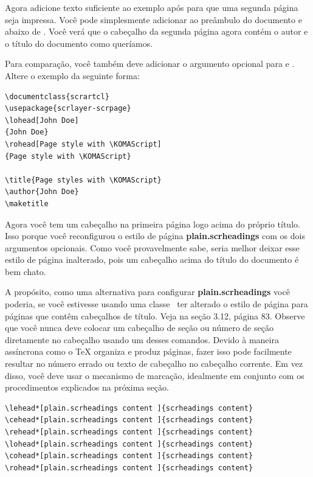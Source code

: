 Agora adicione texto suficiente ao exemplo após  para que uma segunda página seja impressa. Você pode simplesmente adicionar  ao preâmbulo do documento e  abaixo de . Você verá que o cabeçalho da segunda página agora contém o autor e o título do documento como queríamos.

Para comparação, você também deve adicionar o argumento opcional para 
 e . Altere o exemplo da seguinte forma:

\begin{verbatim}
\documentclass{scrartcl}
\usepackage{scrlayer-scrpage}
\lohead[John Doe]
{John Doe}
\rohead[Page style with \KOMAScript]
{Page style with \KOMAScript}

\title{Page styles with \KOMAScript}
\author{John Doe}
\maketitle

\end{verbatim}

Agora você tem um cabeçalho na primeira página logo acima do próprio título. Isso porque você reconfigurou o estilo de página \textbf{plain.scrheadings} com os dois argumentos opcionais. Como você provavelmente sabe, seria melhor deixar esse estilo de página inalterado, pois um cabeçalho acima do título do documento é bem chato.

A propósito, como uma alternativa para configurar \textbf{plain.scrheadings} você poderia, se você estivesse usando uma classe \KOMAScript\ ter alterado o estilo de página para páginas que contêm cabeçalhos de título. Veja  na seção 3.12, página 83.
Observe que você nunca deve colocar um cabeçalho de seção ou número de seção diretamente no cabeçalho usando um desses comandos. Devido à maneira assíncrona como o TeX organiza e produz páginas, fazer isso pode facilmente resultar no número errado ou texto de cabeçalho no cabeçalho corrente. Em vez disso, você deve usar o mecanismo de marcação, idealmente em conjunto com os procedimentos explicados na próxima seção.
\begin{verbatim}
\lehead*[plain.scrheadings content ]{scrheadings content}
\cehead*[plain.scrheadings content ]{scrheadings content}
\rehead*[plain.scrheadings content ]{scrheadings content}
\lohead*[plain.scrheadings content ]{scrheadings content}
\cohead*[plain.scrheadings content ]{scrheadings content}
\rohead*[plain.scrheadings content ]{scrheadings content}
\end{verbatim}


